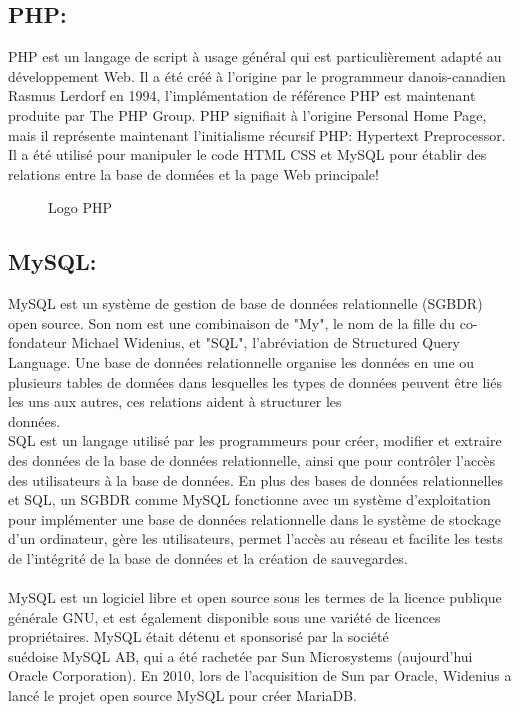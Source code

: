 \documentclass[12pt]{report}
\begin{document}
\vspace{-0.18in}

\subsection{PHP:}

PHP est un langage de script à usage général qui est particulièrement adapté au développement Web. Il a été créé à l'origine par le programmeur danois-canadien Rasmus Lerdorf en 1994, l'implémentation de référence PHP est maintenant produite par The PHP Group. PHP signifiait à l'origine Personal Home Page, mais il représente maintenant l'initialisme récursif PHP: Hypertext Preprocessor.
\\
Il a été utilisé pour manipuler le code HTML CSS et MySQL pour établir des relations entre la base de données et la page Web principale!

\vspace{-0.2in}

\begin{figure}[h]
\centering
\vspace{-0.3in}
\caption{Logo PHP}
\end{figure}

\newpage

\subsection{MySQL:}

MySQL est un système de gestion de base de données relationnelle (SGBDR) open source. Son nom est une combinaison de "My", le nom de la fille du co-fondateur Michael Widenius, et "SQL", l'abréviation de Structured Query Language. Une base de données relationnelle organise les données en une ou plusieurs tables de données dans lesquelles les types de données peuvent être liés les uns aux autres, ces relations aident à structurer les\\ données.
\\
SQL est un langage utilisé par les programmeurs pour créer, modifier et extraire des données de la base de données relationnelle, ainsi que pour contrôler l'accès des utilisateurs à la base de données. En plus des bases de données relationnelles et SQL, un SGBDR comme MySQL fonctionne avec un système d'exploitation pour implémenter une base de données relationnelle dans le système de stockage d'un ordinateur, gère les utilisateurs, permet l'accès au réseau et facilite les tests de l'intégrité de la base de données et la création de sauvegardes.
\\\\
MySQL est un logiciel libre et open source sous les termes de la licence publique générale GNU, et est également disponible sous une variété de licences propriétaires. MySQL était détenu et sponsorisé par la société \\suédoise MySQL AB, qui a été rachetée par Sun Microsystems (aujourd'hui Oracle Corporation). En 2010, lors de l'acquisition de Sun par Oracle, Widenius a lancé le projet open source MySQL pour créer MariaDB.
\end{document}
